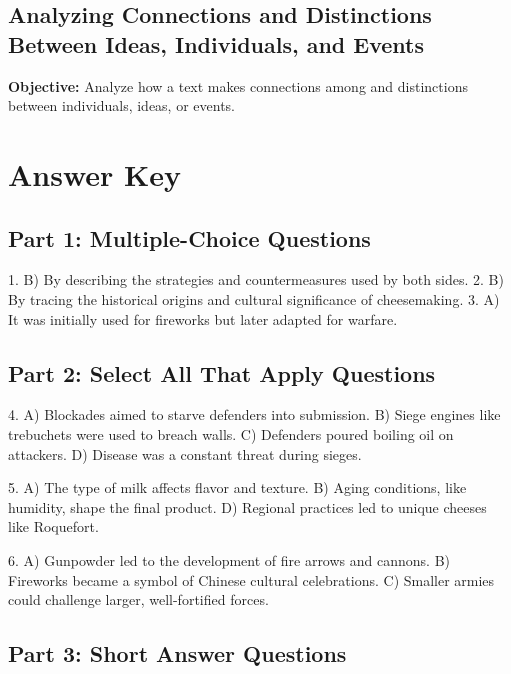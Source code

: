 \documentclass[12pt]{article}
\begin{document}
\subsection*{Analyzing Connections and Distinctions Between Ideas, Individuals, and Events}
\onehalfspacing

\begin{tcolorbox}[colframe=black!40, colback=gray!0, title=Learning Objective]
\textbf{Objective:} Analyze how a text makes connections among and distinctions between individuals, ideas, or events.
\end{tcolorbox}

\section*{Answer Key}

\subsection*{Part 1: Multiple-Choice Questions}

1. B) By describing the strategies and countermeasures used by both sides.  
2. B) By tracing the historical origins and cultural significance of cheesemaking.  
3. A) It was initially used for fireworks but later adapted for warfare.

\subsection*{Part 2: Select All That Apply Questions}

4. A) Blockades aimed to starve defenders into submission.  
   B) Siege engines like trebuchets were used to breach walls.  
   C) Defenders poured boiling oil on attackers.  
   D) Disease was a constant threat during sieges.  

5. A) The type of milk affects flavor and texture.  
   B) Aging conditions, like humidity, shape the final product.  
   D) Regional practices led to unique cheeses like Roquefort.

6. A) Gunpowder led to the development of fire arrows and cannons.  
   B) Fireworks became a symbol of Chinese cultural celebrations.  
   C) Smaller armies could challenge larger, well-fortified forces.

\subsection*{Part 3: Short Answer Questions}
\end{document}
